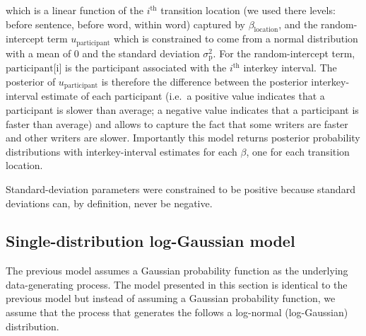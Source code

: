 \documentclass[
  man,floatsintext]{apa7}
\begin{document}
which is a linear function of the \(i^\text{th}\) transition location (we used there levels: before sentence, before word, within word) captured by \(\beta_\text{location}\), and the random-intercept term \(u_\text{participant}\) which is constrained to come from a normal distribution with a mean of 0 and the standard deviation \(\sigma_\text{p}^2\). For the random-intercept term, \(\text{participant[i]}\) is the participant associated with the \(i^\text{th}\) interkey interval. The posterior of \(u_\text{participant}\) is therefore the difference between the posterior interkey-interval estimate of each participant (i.e.~a positive value indicates that a participant is slower than average; a negative value indicates that a participant is faster than average) and allows to capture the fact that some writers are faster and other writers are slower. Importantly this model returns posterior probability distributions with interkey-interval estimates for each \(\beta\), one for each transition location.

Standard-deviation parameters were constrained to be positive because standard deviations can, by definition, never be negative.

\hypertarget{single-distribution-log-gaussian-model}{%
\subsection{Single-distribution log-Gaussian model}\label{single-distribution-log-gaussian-model}}

The previous model assumes a Gaussian probability function as the underlying data-generating process. The model presented in this section is identical to the previous model but instead of assuming a Gaussian probability function, we assume that the process that generates the follows a log-normal (log-Gaussian) distribution.
\end{document}
